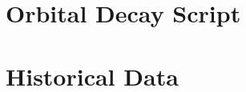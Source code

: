 \documentclass[paper=letter, fontsize=11pt]{scrartcl} %
\numberwithin{equation}{section} %
\numberwithin{figure}{section} %
\numberwithin{table}{section} %
\begin{document}






\section{Orbital Decay Script} \label{App:orb}


\section{Historical Data}

\end{document}
